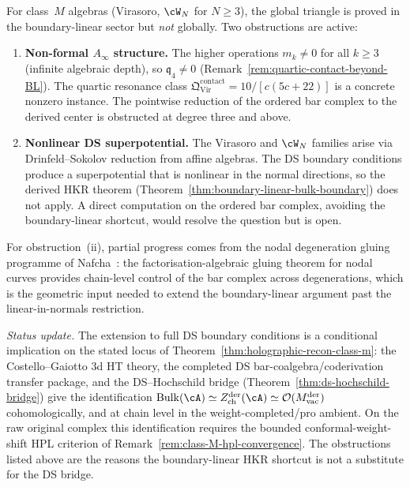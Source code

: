 \begin{remark}%
\label{rem:class-M-global-triangle-gap}%
%
%
For class~$M$ algebras (Virasoro, $\cW_N$ for $N \geq 3$), the
global triangle is proved in the boundary-linear sector but
\emph{not} globally. Two obstructions are active:
\begin{enumerate}[label=(\roman*)]
\item \textbf{Non-formal $A_\infty$ structure.}
 The higher operations $m_k \neq 0$ for all $k \geq 3$
 (infinite algebraic depth), so
 $\mathfrak{q}_4 \neq 0$
 (Remark~\ref{rem:quartic-contact-beyond-BL}).
 The quartic resonance class
 $\mathfrak{Q}^{\mathrm{contact}}_{\mathrm{Vir}} =
 10/[c(5c+22)]$ is a concrete nonzero instance.
 The pointwise reduction of the ordered bar complex to
 the derived center is obstructed at degree three and above.

\item \textbf{Nonlinear DS superpotential.}
 The Virasoro and $\cW_N$ families arise via Drinfeld--Sokolov
 reduction from affine algebras. The DS boundary conditions
 produce a superpotential that is nonlinear in the normal
 directions, so the derived HKR theorem
 (Theorem~\ref{thm:boundary-linear-bulk-boundary}) does not
 apply. A direct computation on the ordered bar complex,
 avoiding the boundary-linear shortcut, would resolve the
 question but is open.
\end{enumerate}

For obstruction~(ii), partial progress comes from the
nodal degeneration gluing programme of
Nafcha~\cite{Nafcha26}: the factorisation-algebraic
gluing theorem for nodal curves provides chain-level
control of the bar complex across degenerations, which
is the geometric input needed to extend the boundary-linear
argument past the linear-in-normals restriction.

\emph{Status update.} The extension to full DS boundary conditions is a
conditional implication on the stated locus of
Theorem~\ref{thm:holographic-recon-class-m}: the Costello--Gaiotto
$3$d HT theory, the completed DS bar-coalgebra/coderivation transfer
package, and the DS--Hochschild bridge
(Theorem~\ref{thm:ds-hochschild-bridge}) give
the identification
$\mathrm{Bulk}(\cA)\simeq
Z^{\mathrm{der}}_{\mathrm{ch}}(\cA)\simeq
\mathcal{O}(M_{\mathrm{vac}}^{\mathrm{der}})$
cohomologically, and at chain level in the weight-completed/pro
ambient. On the raw original complex this identification requires the
bounded conformal-weight-shift HPL criterion of
Remark~\ref{rem:class-M-hpl-convergence}. The obstructions listed
above are the reasons the boundary-linear HKR shortcut is not a
substitute for the DS bridge.
\end{remark}

